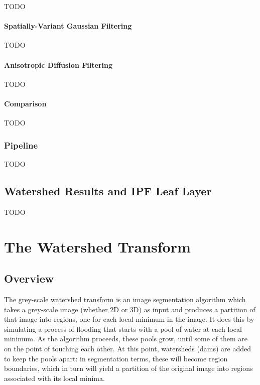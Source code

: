 TODO

\paragraph{Spatially-Variant Gaussian Filtering}

TODO

\paragraph{Anisotropic Diffusion Filtering}

TODO

\paragraph{Comparison}

TODO

\subsubsection{Pipeline}

TODO

\subsection{Watershed Results and IPF Leaf Layer}

TODO

\iftrue

\section{The Watershed Transform}

\subsection{Overview}

The grey-scale watershed transform is an image segmentation algorithm which takes a grey-scale image (whether 2D or 3D) as input and produces a partition of that image into regions, one for each local minimum in the image. It does this by simulating a process of flooding that starts with a pool of water at each local minimum. As the algorithm proceeds, these pools grow, until some of them are on the point of touching each other. At this point, watersheds (dams) are added to keep the pools apart: in segmentation terms, these will become region boundaries, which in turn will yield a partition of the original image into regions associated with its local minima.

